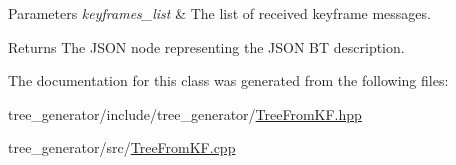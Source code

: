 \begin{DoxyParams}{Parameters}
{\em keyframes\-\_\-list} & The list of received keyframe messages. \\
\hline
\end{DoxyParams}
\begin{DoxyReturn}{Returns}
The J\-S\-O\-N node representing the J\-S\-O\-N B\-T description. 
\end{DoxyReturn}


The documentation for this class was generated from the following files\-:\begin{DoxyCompactItemize}
\item 
tree\-\_\-generator/include/tree\-\_\-generator/\hyperlink{TreeFromKF_8hpp}{Tree\-From\-K\-F.\-hpp}\item 
tree\-\_\-generator/src/\hyperlink{TreeFromKF_8cpp}{Tree\-From\-K\-F.\-cpp}\end{DoxyCompactItemize}
